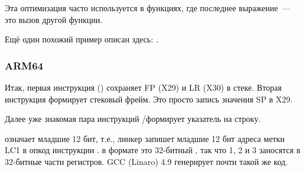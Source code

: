 Эта оптимизация часто используется в функциях, где последнее выражение~--- это вызов другой функции.

Ещё один похожий пример описан здесь:
.

\subsubsection{ARM64}




Итак, первая инструкция  () сохраняет \ac{FP} (X29) и \ac{LR} (X30) в стеке.
Вторая инструкция  формирует стековый фрейм.
Это просто запись значения \ac{SP} в X29.

Далее уже знакомая пара инструкций /\ADD формирует указатель на строку.

 означает младшие 12 бит, т.е., линкер запишет младшие 12 бит адреса метки LC1 в опкод инструкции \ADD.
 в формате \printf это 32-битный \Tint, так что 1, 2 и 3 заносятся в 32-битные части регистров.
\Optimizing GCC (Linaro) 4.9 генерирует почти такой же код.

